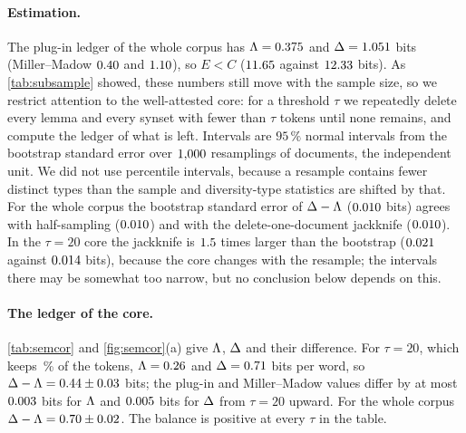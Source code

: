 \paragraph{Estimation.} The plug-in ledger of the whole corpus has $\Lambda=0.375$ and $\Delta=1.051$ bits (Miller--Madow $0.40$ and $1.10$), so $E<C$ ($11.65$ against $12.33$ bits). As \cref{tab:subsample} showed, these numbers still move with the sample size, so we restrict attention to the well-attested core: for a threshold $\tau$ we repeatedly delete every lemma and every synset with fewer than $\tau$ tokens until none remains, and compute the ledger of what is left. Intervals are $95\,\%$ normal intervals from the bootstrap standard error over $\SemB$ resamplings of documents, the independent unit. We did not use percentile intervals, because a resample contains fewer distinct types than the sample and diversity-type statistics are shifted by that. For the whole corpus the bootstrap standard error of $\Delta-\Lambda$ ($0.010$ bits) agrees with half-sampling ($0.010$) and with the delete-one-document jackknife ($0.010$). In the $\tau=20$ core the jackknife is $1.5$ times larger than the bootstrap ($0.021$ against $0.014$ bits), because the core changes with the resample; the intervals there may be somewhat too narrow, but no conclusion below depends on this.

\paragraph{The ledger of the core.} \cref{tab:semcor} and \cref{fig:semcor}(a) give $\Lambda$, $\Delta$ and their difference. For $\tau=20$, which keeps \SemKeptTwenty\,\% of the tokens, $\Lambda=0.26$ and $\Delta=0.71$ bits per word, so $\Delta-\Lambda=0.44\pm0.03$ bits; the plug-in and Miller--Madow values differ by at most $0.003$ bits for $\Lambda$ and $0.005$ bits for $\Delta$ from $\tau=20$ upward. For the whole corpus $\Delta-\Lambda=0.70\pm0.02$. The balance is positive at every $\tau$ in the table.
\begin{table}[tbp]
\caption{The ledger of the well-attested core of SemCor, form: lemma. $\tau$ is the minimum number of tokens of every kept lemma and synset. Miller--Madow estimates in bits with $95\,\%$ intervals from $\SemB$ document resamplings.}\label{tab:semcor}
\centering\small

\end{table}


